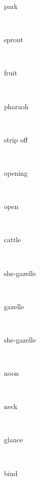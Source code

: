 \documentclass[a4paper]{article}
\begin{document}
\begin{multicols}{4}
\begin{multicols}{4}
\begin{multicols}{5}
{\hebrewfont{}} \begin{english}park\end{english}\\
{\hebrewfont{}} \begin{english}sprout\end{english}\\
{\hebrewfont{}} \begin{english}fruit\end{english}\\
{\hebrewfont{}} \begin{english}pharaoh\end{english}\\
{\hebrewfont{}} \begin{english}strip off\end{english}\\
{\hebrewfont{}} \begin{english}opening\end{english}\\
{\hebrewfont{}} \begin{english}open\end{english}\\
{\hebrewfont{}} \begin{english}cattle\end{english}\\
{\hebrewfont{}} \begin{english}she-gazelle\end{english}\\
{\hebrewfont{}} \begin{english}gazelle\end{english}\\
{\hebrewfont{}} \begin{english}she-gazelle\end{english}\\
{\hebrewfont{}} \begin{english}noon\end{english}\\
{\hebrewfont{}} \begin{english}neck\end{english}\\
{\hebrewfont{}} \begin{english}glance\end{english}\\
{\hebrewfont{}} \begin{english}bind\end{english}\\

\end{multicols}
\end{multicols}
\end{multicols}
\end{document}
